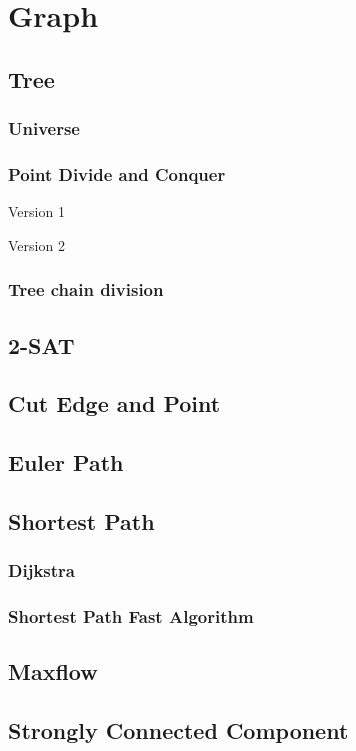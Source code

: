\section{Graph}
\subsection{Tree}
\subsubsection{Universe}

\subsubsection{Point Divide and Conquer}

Version 1


Version 2


\subsubsection{Tree chain division}


\subsection{2-SAT}


\subsection{Cut Edge and Point}


\subsection{Euler Path}


\subsection{Shortest Path}
\subsubsection{Dijkstra}

\subsubsection{Shortest Path Fast Algorithm}


\subsection{Maxflow}


\subsection{Strongly Connected Component}

